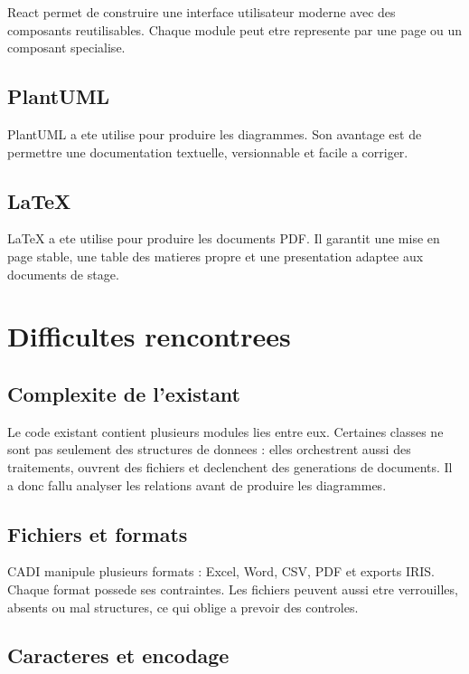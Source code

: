 \documentclass[11pt,a4paper]{report}
\begin{document}
React permet de construire une interface utilisateur moderne avec des composants reutilisables. Chaque module peut etre represente par une page ou un composant specialise.

\section{PlantUML}

PlantUML a ete utilise pour produire les diagrammes. Son avantage est de permettre une documentation textuelle, versionnable et facile a corriger.

\section{LaTeX}

LaTeX a ete utilise pour produire les documents PDF. Il garantit une mise en page stable, une table des matieres propre et une presentation adaptee aux documents de stage.

\chapter{Difficultes rencontrees}

\section{Complexite de l'existant}

Le code existant contient plusieurs modules lies entre eux. Certaines classes ne sont pas seulement des structures de donnees : elles orchestrent aussi des traitements, ouvrent des fichiers et declenchent des generations de documents. Il a donc fallu analyser les relations avant de produire les diagrammes.

\section{Fichiers et formats}

CADI manipule plusieurs formats : Excel, Word, CSV, PDF et exports IRIS. Chaque format possede ses contraintes. Les fichiers peuvent aussi etre verrouilles, absents ou mal structures, ce qui oblige a prevoir des controles.

\section{Caracteres et encodage}
\end{document}
